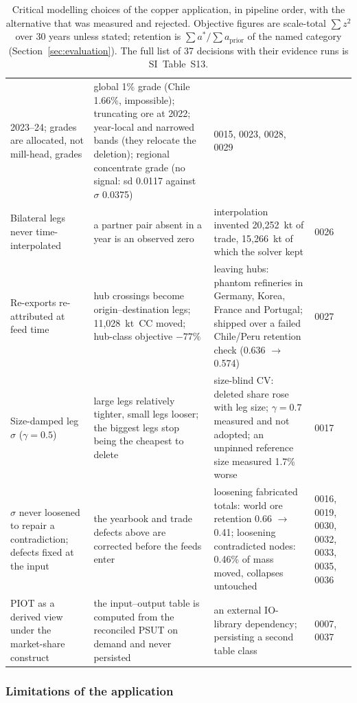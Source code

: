 \begin{table}[t]
\begin{tabular}{@{}p{3.2cm}p{5.1cm}p{5.9cm}p{1.2cm}@{}}
2023--24; grades are allocated, not mill-head, grades & global 1\% grade
(Chile 1.66\%, impossible); truncating ore at 2022; year-local and narrowed
bands (they relocate the deletion); regional concentrate grade (no signal: sd
0.0117 against $\sigma$ 0.0375) & 0015, 0023, 0028, 0029 \\[2pt]
Bilateral legs never time-interpolated & a partner pair absent in a year is an
observed zero & interpolation invented 20{,}252~kt of trade, 15{,}266~kt of
which the solver kept & 0026 \\[2pt]
Re-exports re-attributed at feed time & hub crossings become
origin--destination legs; 11{,}028~kt~CC moved; hub-class objective $-77\%$ &
leaving hubs: phantom refineries in Germany, Korea, France and Portugal;
shipped over a failed Chile/Peru retention check (0.636 $\to$ 0.574) &
0027 \\[2pt]
Size-damped leg $\sigma$ ($\gamma = 0.5$) & large legs relatively tighter,
small legs looser; the biggest legs stop being the cheapest to delete &
size-blind CV: deleted share rose with leg size; $\gamma = 0.7$ measured and
not adopted; an unpinned reference size measured 1.7\% worse & 0017 \\[2pt]
$\sigma$ never loosened to repair a contradiction; defects fixed at the input
& the yearbook and trade defects above are corrected before the feeds enter &
loosening fabricated totals: world ore retention 0.66 $\to$ 0.41; loosening
contradicted nodes: 0.46\% of mass moved, collapses untouched & 0016, 0019,
0030, 0032, 0033, 0035, 0036 \\[2pt]
PIOT as a derived view under the market-share construct & the input--output
table is computed from the reconciled PSUT on demand and never persisted &
an external IO-library dependency; persisting a second table class & 0007,
0037 \\
\bottomrule
\end{tabular}
\caption{Critical modelling choices of the copper application, in pipeline
order, with the alternative that was measured and rejected. Objective
figures are scale-total $\sum z^2$ over 30 years unless stated; retention
is $\sum a^*/\sum a_{\mathrm{prior}}$ of the named category
(Section~\ref{sec:evaluation}). The full list of 37 decisions with their
evidence runs is SI~Table~S13.}
\label{tab:choices}
\end{table}

\subsubsection{Limitations of the application}\label{sec:limits}

